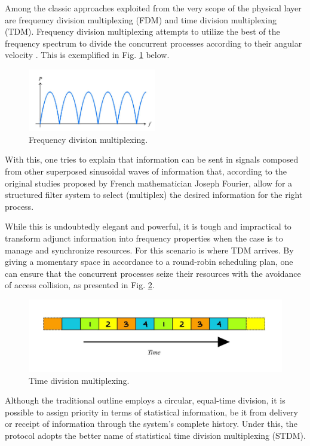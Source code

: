 \documentclass[12pt]{article}
\begin{document}
Among the classic approaches exploited from the very scope of the physical layer are frequency division multiplexing (FDM) and time division multiplexing (TDM). Frequency division multiplexing attempts to utilize the best of the frequency spectrum to divide the concurrent processes according to their angular velocity \cite{compnet}. This is exemplified in Fig. \ref{fig:freq} below.

\begin{figure}[ht]
\includegraphics[width=0.5\textwidth]{freq}
\centering
\caption{Frequency division multiplexing.}
\label{fig:freq}
\end{figure}

With this, one tries to explain that information can be sent in signals composed from other superposed sinusoidal waves of information that, according to the original studies proposed by French mathematician Joseph Fourier, allow for a structured filter system to select (multiplex) the desired information for the right process.

While this is undoubtedly elegant and powerful, it is tough and impractical to transform adjunct information into frequency properties when the case is to manage and synchronize resources. For this scenario is where TDM arrives. By giving a momentary space in accordance to a round-robin scheduling plan, one can ensure that the concurrent processes seize their resources with the avoidance of access collision, as presented in Fig. \ref{fig:time}.

\begin{figure}[ht]
\includegraphics[width=1\textwidth]{time}
\centering
\caption{Time division multiplexing.}
\label{fig:time}
\end{figure}

Although the traditional outline employs a circular, equal-time division, it is possible to assign priority in terms of statistical information, be it from delivery or receipt of information through the system's complete history. Under this, the protocol adopts the better name of statistical time division multiplexing (STDM).
\end{document}
